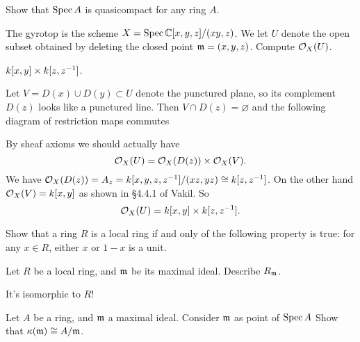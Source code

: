 \begin{dproblem}
	\gim
	Show that $\operatorname{Spec} A$ is quasicompact for any ring $A$.
\end{dproblem}

\begin{problem}
	The gyrotop is the scheme $X = \operatorname{Spec} \mathbb C[x,y,z] / (xy,z)$.
	We let $U$ denote the open subset obtained
	by deleting the closed point $\mathfrak m = (x,y,z)$.
	Compute $\mathcal O_X(U)$.
	\begin{hint}
		$k[x,y] \times k[z,z^{-1}]$.
	\end{hint}
	\begin{soln}
		Let $V = D(x) \cup D(y) \subset U$ denote the punctured plane,
		so its complement $D(z)$ looks like a punctured line.
		Then $V \cap D(z) = \varnothing$ and the following diagram
		of restriction maps commutes
		\begin{center}
		\end{center}
		By sheaf axioms we should actually have
		\[ \mathcal O_X(U) = \mathcal O_X(D(z)) \times \mathcal O_X(V). \]
		We have $\mathcal O_X(D(z)) = A_z = k[x,y,z,z^{-1}]/(xz,yz) \cong k[z,z^{-1}]$.
		On the other hand $\mathcal O_X(V) = k[x,y]$ as shown in \S4.4.1 of Vakil.
		So
		\[ \mathcal O_X(U) = k[x,y] \times k[z,z^{-1}]. \]
	\end{soln}
\end{problem}

\begin{problem}
	Show that a ring $R$ is a local ring
	if and only of the following property is true:
	for any $x \in R$,
	either $x$ or $1-x$ is a unit.
\end{problem}

\begin{problem}
	Let $R$ be a local ring, and $\mathfrak m$ be its maximal ideal.
	Describe $R_\mathfrak m$.
	\begin{hint}
		It's isomorphic to $R$!
	\end{hint}
\end{problem}

\begin{problem}
	Let $A$ be a ring, and $\mathfrak m$ a maximal ideal.
	Consider $\mathfrak m$ as point of $\operatorname{Spec} A$
	Show that $\kappa(\mathfrak m) \cong A/\mathfrak m$.
\end{problem}
